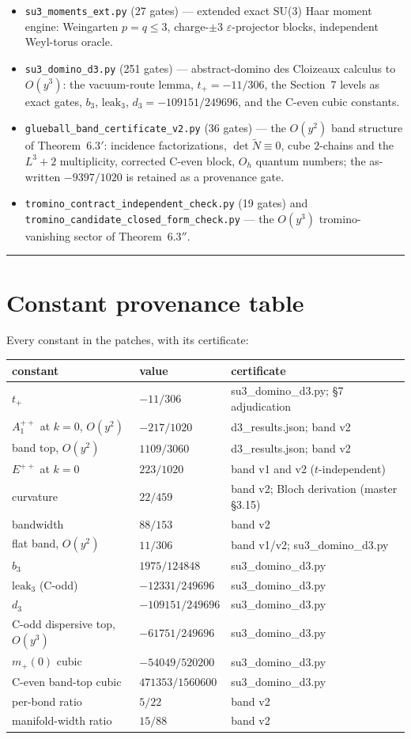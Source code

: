 \documentclass[11pt]{article}
\begin{document}
\begin{itemize}
\item \texttt{su3\_moments\_ext.py} (27 gates) --- extended exact SU(3) Haar
moment engine: Weingarten $p=q\le3$, charge-$\pm3$ $\varepsilon$-projector
blocks, independent Weyl-torus oracle.
\item \texttt{su3\_domino\_d3.py} (251 gates) --- abstract-domino des
Cloizeaux calculus to $O(y^3)$: the vacuum-route lemma, $t_+=-11/306$, the
Section~7 levels as exact gates, $b_3$, $\mathrm{leak}_3$,
$d_3=-109151/249696$, and the C-even cubic constants.
\item \texttt{glueball\_band\_certificate\_v2.py} (36 gates) --- the
$O(y^2)$ band structure of Theorem~$6.3'$: incidence factorizations,
$\det\widetilde N\equiv0$, cube $2$-chains and the $L^3+2$ multiplicity,
corrected C-even block, $O_h$ quantum numbers; the as-written
$-9397/1020$ is retained as a provenance gate.
\item \texttt{tromino\_contract\_independent\_check.py} (19 gates) and
\texttt{tromino\_candidate\_closed\_form\_check.py} --- the $O(y^3)$
tromino-vanishing sector of Theorem~$6.3''$.
\end{itemize}

\bigskip\hrule\bigskip
\section*{Constant provenance table}
\noindent Every constant in the patches, with its certificate:
\begin{center}
\begin{tabular}{lll}
constant & value & certificate \\\hline
$t_+$ & $-11/306$ & su3\_domino\_d3.py; \S7 adjudication \\
$A_1^{++}$ at $k=0$, $O(y^2)$ & $-217/1020$ & d3\_results.json; band v2 \\
band top, $O(y^2)$ & $1109/3060$ & d3\_results.json; band v2 \\
$E^{++}$ at $k=0$ & $223/1020$ & band v1 and v2 ($t$-independent) \\
curvature & $22/459$ & band v2; Bloch derivation (master \S3.15) \\
bandwidth & $88/153$ & band v2 \\
flat band, $O(y^2)$ & $11/306$ & band v1/v2; su3\_domino\_d3.py \\
$b_3$ & $1975/124848$ & su3\_domino\_d3.py \\
$\mathrm{leak}_3$ (C-odd) & $-12331/249696$ & su3\_domino\_d3.py \\
$d_3$ & $-109151/249696$ & su3\_domino\_d3.py \\
C-odd dispersive top, $O(y^3)$ & $-61751/249696$ & su3\_domino\_d3.py \\
$m_+(0)$ cubic & $-54049/520200$ & su3\_domino\_d3.py \\
C-even band-top cubic & $471353/1560600$ & su3\_domino\_d3.py \\
per-bond ratio & $5/22$ & band v2 \\
manifold-width ratio & $15/88$ & band v2 \\
\end{tabular}
\end{center}
\end{document}
